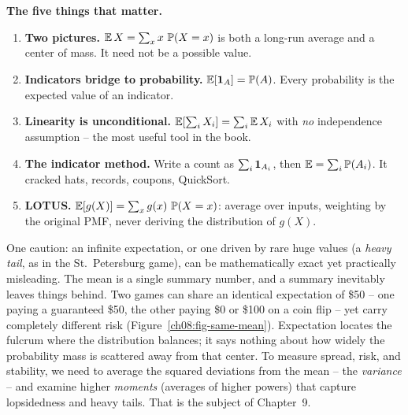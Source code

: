 \begin{focusbox}
\textbf{The five things that matter.}
\begin{enumerate}
  \item \textbf{Two pictures.} $\operatorname{\mathbb{E}} X = \sum_x x\,\operatorname{\mathbb{P}}(X=x)$ is both a long-run
  average and a center of mass. It need not be a possible value.
  \item \textbf{Indicators bridge to probability.} $\operatorname{\mathbb{E}}[\mathbf{1}_A] = \operatorname{\mathbb{P}}(A)$. Every
  probability is the expected value of an indicator.
  \item \textbf{Linearity is unconditional.} $\operatorname{\mathbb{E}}[\sum_i X_i] = \sum_i \operatorname{\mathbb{E}} X_i$
  with \emph{no} independence assumption -- the most useful tool in the book.
  \item \textbf{The indicator method.} Write a count as $\sum_i \mathbf{1}_{A_i}$,
  then $\operatorname{\mathbb{E}} = \sum_i \operatorname{\mathbb{P}}(A_i)$. It cracked hats, records, coupons, QuickSort.
  \item \textbf{LOTUS.} $\operatorname{\mathbb{E}}[g(X)] = \sum_x g(x)\,\operatorname{\mathbb{P}}(X=x)$: average over inputs,
  weighting by the original PMF, never deriving the distribution of $g(X)$.
\end{enumerate}
One caution: an infinite expectation, or one driven by rare huge values (a
\emph{heavy tail}, as in the St.\ Petersburg game), can be mathematically exact
yet practically misleading. The mean is a single summary number,
and a summary inevitably leaves things behind. Two games can share an identical
expectation of \$50 -- one paying a guaranteed \$50, the other paying
\$0 or \$100 on a coin flip -- yet carry completely different
risk (Figure~\ref{ch08:fig-same-mean}). Expectation locates the fulcrum where the distribution balances; it says
nothing about how widely the probability mass is scattered away from that center.
To measure spread, risk, and stability, we need to average the squared deviations
from the mean -- the \emph{variance} -- and examine higher \emph{moments}
(averages of higher powers) that capture lopsidedness and heavy tails. That is the subject of Chapter~9.
\end{focusbox}

